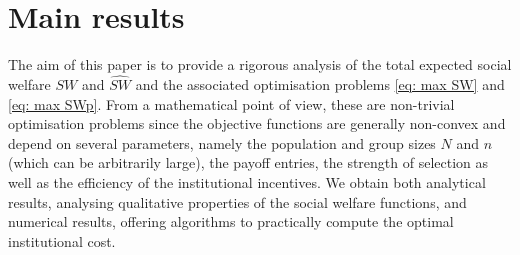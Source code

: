\documentclass{article}
\begin{document}
\section{Main results}
\label{sec: main results}
The aim of this paper is to provide a rigorous analysis of the total expected social welfare $SW$ and $\widehat{SW}$ and the associated optimisation problems \eqref{eq: max SW} and \eqref{eq: max SWp}. From a mathematical point of view, these are  non-trivial optimisation problems since the objective functions
are generally non-convex and depend on several parameters, namely the population and group sizes $N$
and $n$ (which can be arbitrarily large), the payoff entries, the strength of selection as well as  the efficiency of
the institutional incentives. We obtain both analytical results, analysing qualitative properties of the social welfare functions, and numerical results, offering algorithms to practically compute the optimal institutional cost.
\end{document}
